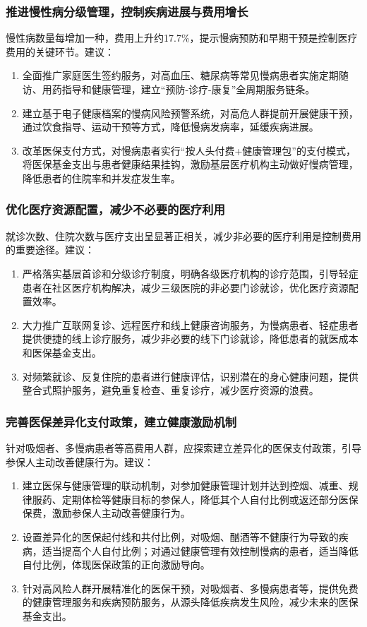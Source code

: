 \documentclass[a4paper]{ctexart}
\begin{document}
\subsubsection{推进慢性病分级管理，控制疾病进展与费用增长}

慢性病数量每增加一种，费用上升约17.7\%，提示慢病预防和早期干预是控制医疗费用的关键环节。建议：
\begin{enumerate}[label=(\arabic*)]
\item 全面推广家庭医生签约服务，对高血压、糖尿病等常见慢病患者实施定期随访、用药指导和健康管理，建立“预防-诊疗-康复”全周期服务链条。
\item 建立基于电子健康档案的慢病风险预警系统，对高危人群提前开展健康干预，通过饮食指导、运动干预等方式，降低慢病发病率，延缓疾病进展。
\item 改革医保支付方式，对慢病患者实行“按人头付费+健康管理包”的支付模式，将医保基金支出与患者健康结果挂钩，激励基层医疗机构主动做好慢病管理，降低患者的住院率和并发症发生率。
\end{enumerate}

\subsubsection{优化医疗资源配置，减少不必要的医疗利用}

就诊次数、住院次数与医疗支出呈显著正相关，减少非必要的医疗利用是控制费用的重要途径。建议：
\begin{enumerate}[label=(\arabic*)]
\item 严格落实基层首诊和分级诊疗制度，明确各级医疗机构的诊疗范围，引导轻症患者在社区医疗机构解决，减少三级医院的非必要门诊就诊，优化医疗资源配置效率。
\item 大力推广互联网复诊、远程医疗和线上健康咨询服务，为慢病患者、轻症患者提供便捷的线上诊疗服务，减少非必要的线下门诊就诊，降低患者的就医成本和医保基金支出。
\item 对频繁就诊、反复住院的患者进行健康评估，识别潜在的身心健康问题，提供整合式照护服务，避免重复检查、重复诊疗，减少医疗资源的浪费。
\end{enumerate}

\subsubsection{完善医保差异化支付政策，建立健康激励机制}

针对吸烟者、多慢病患者等高费用人群，应探索建立差异化的医保支付政策，引导参保人主动改善健康行为。建议：
\begin{enumerate}[label=(\arabic*)]
\item 建立医保与健康管理的联动机制，对参加健康管理计划并达到控烟、减重、规律服药、定期体检等健康目标的参保人，降低其个人自付比例或返还部分医保保费，激励参保人主动改善健康行为。
\item 设置差异化的医保起付线和共付比例，对吸烟、酗酒等不健康行为导致的疾病，适当提高个人自付比例；对通过健康管理有效控制慢病的患者，适当降低自付比例，体现医保政策的正向激励导向。
\item 针对高风险人群开展精准化的医保干预，对吸烟者、多慢病患者等，提供免费的健康管理服务和疾病预防服务，从源头降低疾病发生风险，减少未来的医保基金支出。
\end{enumerate}
\end{document}
